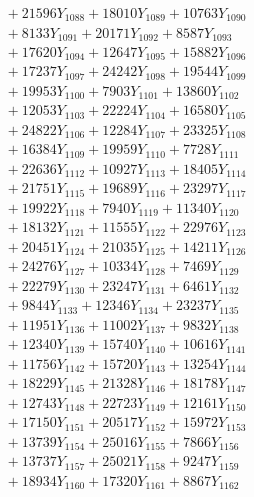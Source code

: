 \documentclass[a4paper,10pt]{article}
\begin{document}
{\begin{align}
&\;  + 21596 Y_{1088} + 18010 Y_{1089} + 10763 Y_{1090} \\[0.3ex]
&\;  + 8133 Y_{1091} + 20171 Y_{1092} + 8587 Y_{1093} \\[0.3ex]
&\;  + 17620 Y_{1094} + 12647 Y_{1095} + 15882 Y_{1096} \\[0.3ex]
&\;  + 17237 Y_{1097} + 24242 Y_{1098} + 19544 Y_{1099} \\[0.3ex]
&\;  + 19953 Y_{1100} + 7903 Y_{1101} + 13860 Y_{1102} \\[0.3ex]
&\;  + 12053 Y_{1103} + 22224 Y_{1104} + 16580 Y_{1105} \\[0.3ex]
&\;  + 24822 Y_{1106} + 12284 Y_{1107} + 23325 Y_{1108} \\[0.5ex]\allowbreak
&\;  + 16384 Y_{1109} + 19959 Y_{1110} + 7728 Y_{1111} \\[0.3ex]
&\;  + 22636 Y_{1112} + 10927 Y_{1113} + 18405 Y_{1114} \\[0.3ex]
&\;  + 21751 Y_{1115} + 19689 Y_{1116} + 23297 Y_{1117} \\[0.3ex]
&\;  + 19922 Y_{1118} + 7940 Y_{1119} + 11340 Y_{1120} \\[0.3ex]
&\;  + 18132 Y_{1121} + 11555 Y_{1122} + 22976 Y_{1123} \\[0.3ex]
&\;  + 20451 Y_{1124} + 21035 Y_{1125} + 14211 Y_{1126} \\[0.3ex]
&\;  + 24276 Y_{1127} + 10334 Y_{1128} + 7469 Y_{1129} \\[0.3ex]
&\;  + 22279 Y_{1130} + 23247 Y_{1131} + 6461 Y_{1132} \\[0.3ex]
&\;  + 9844 Y_{1133} + 12346 Y_{1134} + 23237 Y_{1135} \\[0.3ex]
&\;  + 11951 Y_{1136} + 11002 Y_{1137} + 9832 Y_{1138} \\[0.5ex]\allowbreak
&\;  + 12340 Y_{1139} + 15740 Y_{1140} + 10616 Y_{1141} \\[0.3ex]
&\;  + 11756 Y_{1142} + 15720 Y_{1143} + 13254 Y_{1144} \\[0.3ex]
&\;  + 18229 Y_{1145} + 21328 Y_{1146} + 18178 Y_{1147} \\[0.3ex]
&\;  + 12743 Y_{1148} + 22723 Y_{1149} + 12161 Y_{1150} \\[0.3ex]
&\;  + 17150 Y_{1151} + 20517 Y_{1152} + 15972 Y_{1153} \\[0.3ex]
&\;  + 13739 Y_{1154} + 25016 Y_{1155} + 7866 Y_{1156} \\[0.3ex]
&\;  + 13737 Y_{1157} + 25021 Y_{1158} + 9247 Y_{1159} \\[0.3ex]
&\;  + 18934 Y_{1160} + 17320 Y_{1161} + 8867 Y_{1162} \\[0.3ex]

\end{align}}
\end{document}
